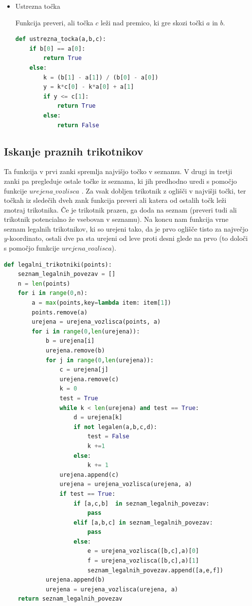 \documentclass[a4, 12pt]{article}
\begin{document}
\begin{itemize}
	\item Ustrezna točka

Funkcija preveri, ali točka $c$ leži nad premico, ki gre skozi točki $a$ in $b$.

\begin{lstlisting}[language=Python]
def ustrezna_tocka(a,b,c):
    if b[0] == a[0]:
        return True 
    else:
        k = (b[1] - a[1]) / (b[0] - a[0])
        y = k*c[0] - k*a[0] + a[1]
        if y <= c[1]:
            return True
        else:
            return False
\end{lstlisting}

\end{itemize}


\subsection{Iskanje praznih trikotnikov}

Ta funkcija v prvi zanki spremlja najvišjo točko v seznamu. V drugi in tretji zanki pa pregleduje ostale točke iz seznama, ki jih predhodno uredi s pomočjo funkcije $urejena\_vozlisca$ . Za vsak dobljen trikotnik z oglišči v najvišji točki, ter točkah iz sledečih dveh zank funkcija preveri ali katera od ostalih točk leži znotraj trikotnika. Če je trikotnik prazen, ga doda na seznam (preveri tudi ali trikotnik potencialno že vsebovan v seznamu).  
Na koncu nam funkcija vrne seznam legalnih trikotnikov, ki so urejeni tako, da je prvo oglišče tisto za največjo $y$-koordinato, ostali dve pa sta urejeni od leve proti desni glede na prvo (to  določi s pomočjo funkcije $urejena\_vozlisca$).

\begin{lstlisting}[language=Python]
def legalni_trikotniki(points):
    seznam_legalnih_povezav = []
    n = len(points)
    for i in range(0,n): 
        a = max(points,key=lambda item: item[1])
        points.remove(a) 
        urejena = urejena_vozlisca(points, a)
        for i in range(0,len(urejena)):
            b = urejena[i]
            urejena.remove(b)
            for j in range(0,len(urejena)):
                c = urejena[j]
                urejena.remove(c)
                k = 0
                test = True
                while k < len(urejena) and test == True:
                    d = urejena[k]
                    if not legalen(a,b,c,d):
                        test = False
                        k +=1
                    else:
                        k += 1
                urejena.append(c)
                urejena = urejena_vozlisca(urejena, a)
                if test == True:
                    if [a,c,b]  in seznam_legalnih_povezav:
                        pass
                    elif [a,b,c] in seznam_legalnih_povezav:
                        pass
                    else:
                        e = urejena_vozlisca([b,c],a)[0]
                        f = urejena_vozlisca([b,c],a)[1]
                        seznam_legalnih_povezav.append([a,e,f])
            urejena.append(b)
            urejena = urejena_vozlisca(urejena, a)
    return seznam_legalnih_povezav
\end{lstlisting}
\end{document}
